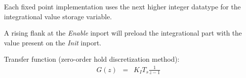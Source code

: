 Each fixed point implementation uses the next higher integer datatype for the integrational value storage variable.

A rising flank at the \textit{Enable} inport will preload the integrational part with the value present on the \textit{Init} inport.
\newline

\noindent
Transfer function (zero-order hold discretization method):
\begin{eqnarray*}
	G(z) &=& K_{I}T_{s}\frac{1}{z-1}
\end{eqnarray*}
